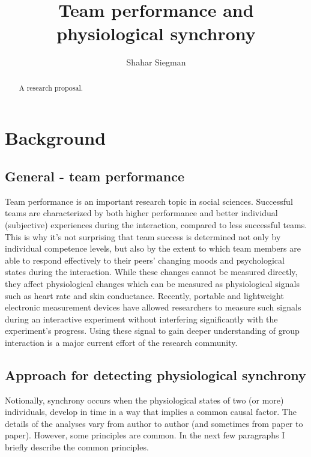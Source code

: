 \documentclass[a4paper, 11pt]{article}      %
\title{\LARGE \bf
Team performance and physiological synchrony
}
\author{Shahar Siegman}
\begin{document}
\maketitle
\thispagestyle{empty}
\pagestyle{empty}


\begin{abstract}

A research proposal.

\end{abstract}

\section{Background}
\subsection{General - team performance}
Team performance is an important research topic in social sciences. Successful teams are characterized by both higher performance and better individual (subjective) experiences during the interaction, compared to less successful teams. This is why it's not surprising that team success is determined not only by individual competence levels, but also by the extent to which team members are able to respond effectively to their peers' changing moods and psychological states during the interaction. While these changes cannot be measured directly, they affect physiological changes which can be measured as physiological signals such as heart rate and skin conductance. Recently, portable and lightweight electronic measurement devices have allowed researchers to measure such signals during an interactive experiment without interfering significantly with the experiment's progress. Using these signal to gain deeper understanding of group interaction is a major current effort of the research community. 


\subsection{Approach for detecting physiological synchrony}
Notionally, synchrony occurs when the physiological states of two (or more) individuals, develop in time in a way that implies a common causal factor. The details of the analyses vary from author to author (and sometimes from paper to paper). However, some principles are common. In the next few paragraphs I briefly describe the common principles.
\end{document}

